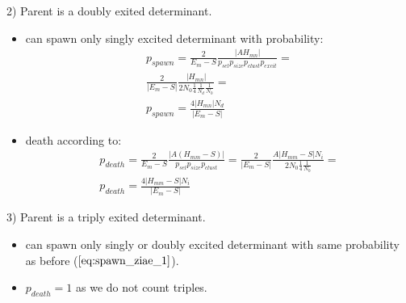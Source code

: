 \documentclass[twoside,english]{uiofysmaster}
\theoremstyle{definition}
\begin{document}
\begin{enumerate}
2) Parent is a doubly exited determinant.

\begin{itemize}
\item can spawn only singly excited determinant with probability:
\begin{align}\label{eq:spawn_ziae_1}
p_{spawn} = \frac{2}{E_m - S} \frac{|AH_{mn}|}{ p_{sel}  p_{size} p_{clust} p_{excit} }=\\
\frac{2}{|E_m  - S|} \frac{|H_{mn}|}{2N_0 \frac{1}{4} \frac{1}{N_d} \frac{1}{N_0}} =\\
p_{spawn} =\frac{4|H_{mn}|N_d}{|E_m  - S|}
\end{align}
\item death according to:
\begin{align}
p_{death} = \frac{2}{E_m - S} \frac{|A(H_{mm}-S)|}{ p_{sel}  p_{size} p_{clust} }= \frac{2}{|E_m - S|} \frac{A|H_{mm}-S|N_i}{ 2N_0 \frac{1}{4} \frac{1}{N_0}}=\\
p_{death} = \frac{4|H_{mm}-S|N_i}{|E_m - S|} 
\end{align}
\end{itemize}
3) Parent is a triply exited determinant.
\begin{itemize}
\item can spawn only singly or doubly excited determinant with same probability as before ($\ref{eq:spawn_ziae_1}$).
\item $p_{death} = 1$ as we do not count triples.
\end{itemize}


\end{enumerate}
\end{document}
